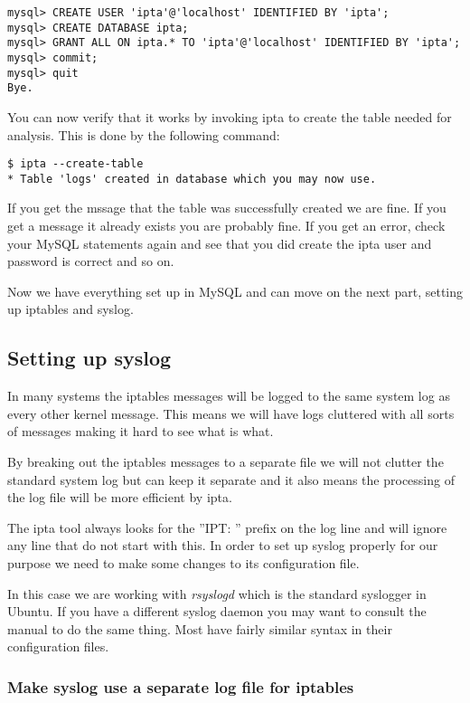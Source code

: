 \documentclass[english,twoside,openright,a4paper,12pt]{article}
\begin{document}
\small
\begin{verbatim}
mysql> CREATE USER 'ipta'@'localhost' IDENTIFIED BY 'ipta';
mysql> CREATE DATABASE ipta;
mysql> GRANT ALL ON ipta.* TO 'ipta'@'localhost' IDENTIFIED BY 'ipta';
mysql> commit;
mysql> quit
Bye.
\end{verbatim}
\normalsize

You can now verify that it works by invoking ipta to create the table 
needed for analysis. This is done by the following command:

\begin{verbatim}
$ ipta --create-table
* Table 'logs' created in database which you may now use.
\end{verbatim}

If you get the mssage that the table was successfully created we are fine. If you get a message it already exists you are probably fine. If you get an error, check your MySQL statements again and see that you did create the ipta user and password is correct and so on.

Now we have everything set up in MySQL and can move on the next part, setting up iptables and syslog.

\subsection{Setting up syslog}

In many systems the iptables messages will be logged to the same system log as every other kernel message. This means we will have logs cluttered with all sorts of messages making it hard to see what is what.

By breaking out the iptables messages to a separate file we will not clutter the standard system log but can keep it separate and it also means the processing of the log file will be more efficient by ipta.

The ipta tool always looks for the ''IPT: '' prefix on the log line and will ignore any line that do not start with this. In order to set up syslog properly for our purpose we need to make some changes to its configuration file.

In this case we are working with \textit{rsyslogd} which is the standard syslogger in Ubuntu. If you have a different syslog daemon you may want to consult the manual to do the same thing. Most have fairly similar syntax in their configuration files.

\subsubsection{Make syslog use a separate log file for iptables}
\end{document}
